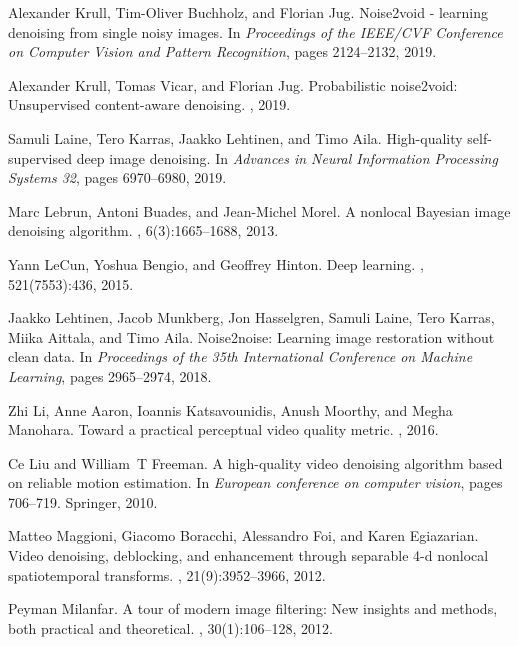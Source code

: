 \documentclass[final]{cvpr}
\begin{document}
{\begin{thebibliography}{10}
Alexander Krull, Tim-Oliver Buchholz, and Florian Jug.
\newblock Noise2void - learning denoising from single noisy images.
\newblock In {\em Proceedings of the IEEE/CVF Conference on Computer Vision and
  Pattern Recognition}, pages 2124--2132, 2019.

Alexander Krull, Tomas Vicar, and Florian Jug.
\newblock Probabilistic noise2void: Unsupervised content-aware denoising.
, 2019.

Samuli Laine, Tero Karras, Jaakko Lehtinen, and Timo Aila.
\newblock High-quality self-supervised deep image denoising.
\newblock In {\em Advances in Neural Information Processing Systems 32}, pages
  6970--6980, 2019.

Marc Lebrun, Antoni Buades, and Jean-Michel Morel.
\newblock A nonlocal {Bayesian} image denoising algorithm.
, 6(3):1665--1688, 2013.

Yann LeCun, Yoshua Bengio, and Geoffrey Hinton.
\newblock Deep learning.
, 521(7553):436, 2015.

Jaakko Lehtinen, Jacob Munkberg, Jon Hasselgren, Samuli Laine, Tero Karras,
  Miika Aittala, and Timo Aila.
\newblock Noise2noise: Learning image restoration without clean data.
\newblock In {\em Proceedings of the 35th International Conference on Machine
  Learning}, pages 2965--2974, 2018.

Zhi Li, Anne Aaron, Ioannis Katsavounidis, Anush Moorthy, and Megha Manohara.
\newblock Toward a practical perceptual video quality metric.
, 2016.

Ce Liu and William~T Freeman.
\newblock A high-quality video denoising algorithm based on reliable motion
  estimation.
\newblock In {\em European conference on computer vision}, pages 706--719.
  Springer, 2010.

Matteo Maggioni, Giacomo Boracchi, Alessandro Foi, and Karen Egiazarian.
\newblock Video denoising, deblocking, and enhancement through separable 4-d
  nonlocal spatiotemporal transforms.
, 21(9):3952--3966, 2012.

Peyman Milanfar.
\newblock A tour of modern image filtering: New insights and methods, both
  practical and theoretical.
, 30(1):106--128, 2012.


\end{thebibliography}}
\end{document}
